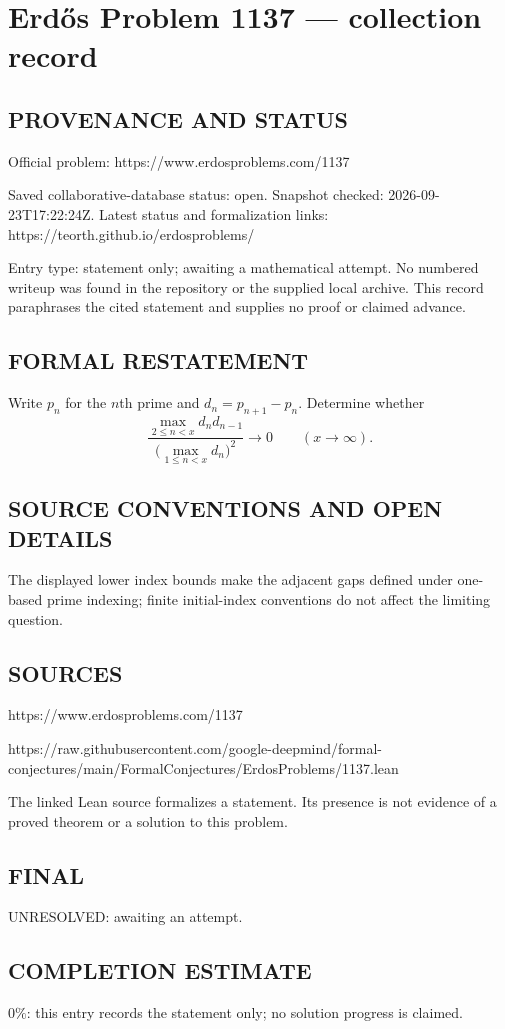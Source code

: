\section*{Erd\H{o}s Problem 1137 --- collection record}

\subsection*{PROVENANCE AND STATUS}
Official problem: https://www.erdosproblems.com/1137

Saved collaborative-database status: open.
Snapshot checked: 2026-09-23T17:22:24Z.
Latest status and formalization links: https://teorth.github.io/erdosproblems/

Entry type: statement only; awaiting a mathematical attempt. No numbered writeup was found in the repository or the supplied local archive. This record paraphrases the cited statement and supplies no proof or claimed advance.

\subsection*{FORMAL RESTATEMENT}
Write $p_n$ for the $n$th prime and $d_n=p_{n+1}-p_n$. Determine whether
\[
\frac{\max_{2\leq n<x}d_nd_{n-1}}{\bigl(\max_{1\leq n<x}d_n\bigr)^2}\longrightarrow0
\qquad(x\to\infty).
\]

\subsection*{SOURCE CONVENTIONS AND OPEN DETAILS}
The displayed lower index bounds make the adjacent gaps defined under one-based prime indexing; finite initial-index conventions do not affect the limiting question.

\subsection*{SOURCES}
https://www.erdosproblems.com/1137

https://raw.githubusercontent.com/google-deepmind/formal-conjectures/main/FormalConjectures/ErdosProblems/1137.lean

The linked Lean source formalizes a statement. Its presence is not evidence of a proved theorem or a solution to this problem.

\subsection*{FINAL}
UNRESOLVED: awaiting an attempt.

\subsection*{COMPLETION ESTIMATE}
$0\%$: this entry records the statement only; no solution progress is claimed.
